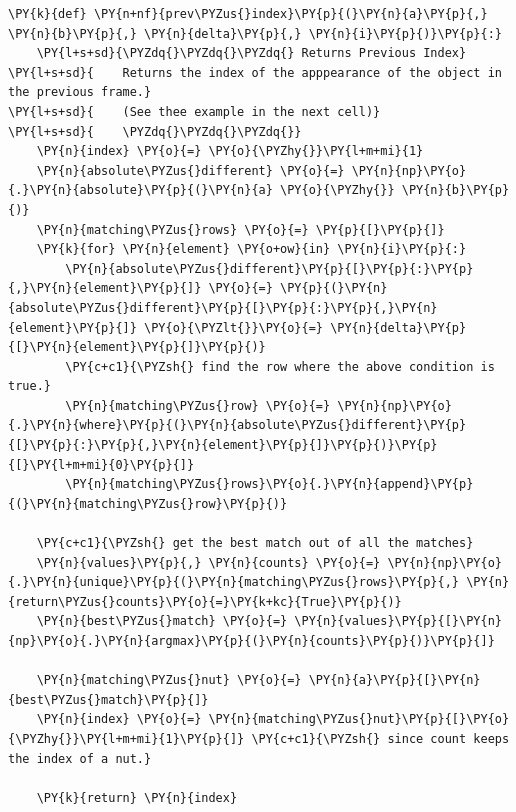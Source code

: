 \documentclass[a4paper,11pt]{article}%
\begin{document}
    \begin{tcolorbox}[breakable, size=fbox, boxrule=1pt, pad at break*=1mm,colback=cellbackground, colframe=cellborder]
\begin{Verbatim}[commandchars=\\\{\}]
\PY{k}{def} \PY{n+nf}{prev\PYZus{}index}\PY{p}{(}\PY{n}{a}\PY{p}{,} \PY{n}{b}\PY{p}{,} \PY{n}{delta}\PY{p}{,} \PY{n}{i}\PY{p}{)}\PY{p}{:}
    \PY{l+s+sd}{\PYZdq{}\PYZdq{}\PYZdq{} Returns Previous Index}
\PY{l+s+sd}{    Returns the index of the apppearance of the object in the previous frame.}
\PY{l+s+sd}{    (See thee example in the next cell)}
\PY{l+s+sd}{    \PYZdq{}\PYZdq{}\PYZdq{}}
    \PY{n}{index} \PY{o}{=} \PY{o}{\PYZhy{}}\PY{l+m+mi}{1}
    \PY{n}{absolute\PYZus{}different} \PY{o}{=} \PY{n}{np}\PY{o}{.}\PY{n}{absolute}\PY{p}{(}\PY{n}{a} \PY{o}{\PYZhy{}} \PY{n}{b}\PY{p}{)}
    \PY{n}{matching\PYZus{}rows} \PY{o}{=} \PY{p}{[}\PY{p}{]}
    \PY{k}{for} \PY{n}{element} \PY{o+ow}{in} \PY{n}{i}\PY{p}{:}
        \PY{n}{absolute\PYZus{}different}\PY{p}{[}\PY{p}{:}\PY{p}{,}\PY{n}{element}\PY{p}{]} \PY{o}{=} \PY{p}{(}\PY{n}{absolute\PYZus{}different}\PY{p}{[}\PY{p}{:}\PY{p}{,}\PY{n}{element}\PY{p}{]} \PY{o}{\PYZlt{}}\PY{o}{=} \PY{n}{delta}\PY{p}{[}\PY{n}{element}\PY{p}{]}\PY{p}{)}
        \PY{c+c1}{\PYZsh{} find the row where the above condition is true.}
        \PY{n}{matching\PYZus{}row} \PY{o}{=} \PY{n}{np}\PY{o}{.}\PY{n}{where}\PY{p}{(}\PY{n}{absolute\PYZus{}different}\PY{p}{[}\PY{p}{:}\PY{p}{,}\PY{n}{element}\PY{p}{]}\PY{p}{)}\PY{p}{[}\PY{l+m+mi}{0}\PY{p}{]}
        \PY{n}{matching\PYZus{}rows}\PY{o}{.}\PY{n}{append}\PY{p}{(}\PY{n}{matching\PYZus{}row}\PY{p}{)}

    \PY{c+c1}{\PYZsh{} get the best match out of all the matches}
    \PY{n}{values}\PY{p}{,} \PY{n}{counts} \PY{o}{=} \PY{n}{np}\PY{o}{.}\PY{n}{unique}\PY{p}{(}\PY{n}{matching\PYZus{}rows}\PY{p}{,} \PY{n}{return\PYZus{}counts}\PY{o}{=}\PY{k+kc}{True}\PY{p}{)}
    \PY{n}{best\PYZus{}match} \PY{o}{=} \PY{n}{values}\PY{p}{[}\PY{n}{np}\PY{o}{.}\PY{n}{argmax}\PY{p}{(}\PY{n}{counts}\PY{p}{)}\PY{p}{]}

    \PY{n}{matching\PYZus{}nut} \PY{o}{=} \PY{n}{a}\PY{p}{[}\PY{n}{best\PYZus{}match}\PY{p}{]}
    \PY{n}{index} \PY{o}{=} \PY{n}{matching\PYZus{}nut}\PY{p}{[}\PY{o}{\PYZhy{}}\PY{l+m+mi}{1}\PY{p}{]} \PY{c+c1}{\PYZsh{} since count keeps the index of a nut.}

    \PY{k}{return} \PY{n}{index}
\end{Verbatim}
\end{tcolorbox}
\end{document}
